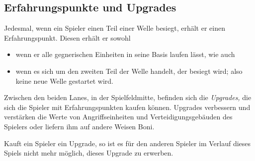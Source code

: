 \subsection{Erfahrungspunkte und Upgrades}\label{sec:exp-upgrades}

Jedesmal, wenn ein Spieler einen Teil einer Welle besiegt, erhält er einen
Erfahrungspunkt. Diesen erhält er sowohl
\begin{itemize}[noitemsep]
    \item wenn er alle gegnerischen Einheiten in seine Basis laufen lässt, wie
      auch
    \item wenn es sich um den zweiten Teil der Welle handelt, der
      besiegt wird; also keine neue Welle gestartet wird.
\end{itemize}

\noindent
Zwischen den beiden Lanes, in der Spielfeldmitte, befinden sich die
\emph{Upgrades,} die sich die Spieler mit Erfahrungspunkten kaufen können.
Upgrades verbessern und verstärken die Werte von Angriffseinheiten und
Verteidigungsgebäuden des Spielers oder liefern ihm auf andere Weisen Boni.

Kauft ein Spieler ein Upgrade, so ist es für den anderen Spieler im Verlauf
dieses Spiels nicht mehr möglich, dieses Upgrade zu erwerben.
